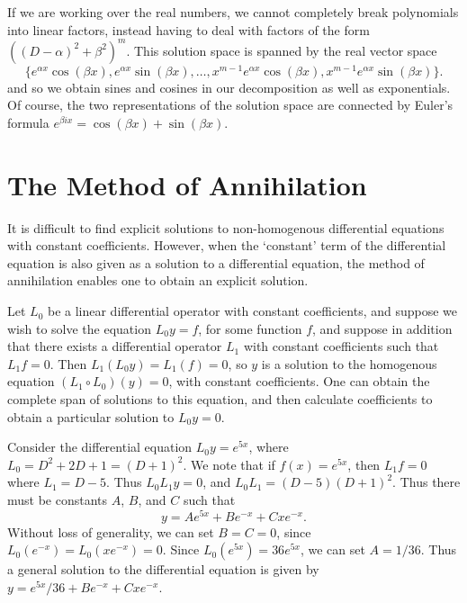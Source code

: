 \begin{remark}
    If we are working over the real numbers, we cannot completely break polynomials into linear factors, instead having to deal with factors of the form $((D - \alpha)^2 + \beta^2)^m$. This solution space is spanned by the real vector space
    \[ \{ e^{\alpha x} \cos(\beta x), e^{\alpha x} \sin(\beta x), \dots, x^{m-1} e^{\alpha x} \cos(\beta x), x^{m-1} e^{\alpha x} \sin(\beta x) \}. \]
    and so we obtain sines and cosines in our decomposition as well as exponentials. Of course, the two representations of the solution space are connected by Euler's formula $e^{\beta ix} = \cos(\beta x) + \sin(\beta x)$.
\end{remark}


\section{The Method of Annihilation}

It is difficult to find explicit solutions to non-homogenous differential equations with constant coefficients. However, when the `constant' term of the differential equation is also given as a solution to a differential equation, the method of annihilation enables one to obtain an explicit solution.

Let $L_0$ be a linear differential operator with constant coefficients, and suppose we wish to solve the equation $L_0y = f$, for some function $f$, and suppose in addition that there exists a differential operator $L_1$ with constant coefficients such that $L_1f = 0$. Then $L_1(L_0 y) = L_1(f) = 0$, so $y$ is a solution to the homogenous equation $(L_1 \circ L_0)(y) = 0$, with constant coefficients. One can obtain the complete span of solutions to this equation, and then calculate coefficients to obtain a particular solution to $L_0y = 0$.

\begin{example}
    Consider the differential equation $L_0y = e^{5x}$, where $L_0 = D^2 + 2D + 1 = (D + 1)^2$. We note that if $f(x) = e^{5x}$, then $L_1 f = 0$ where $L_1 = D - 5$. Thus $L_0L_1y = 0$, and $L_0L_1 = (D - 5)(D+1)^2$. Thus there must be constants $A$, $B$, and $C$ such that
    \[ y = A e^{5x} + B e^{-x} + C x e^{-x}. \]
    Without loss of generality, we can set $B = C = 0$, since $L_0(e^{-x}) = L_0(xe^{-x}) = 0$. Since $L_0(e^{5x}) = 36 e^{5x}$, we can set $A = 1/36$. Thus a general solution to the differential equation is given by $y = e^{5x}/36 + Be^{-x} + Cxe^{-x}$.
\end{example}

\begin{thebibliography}{9}


\end{thebibliography}

